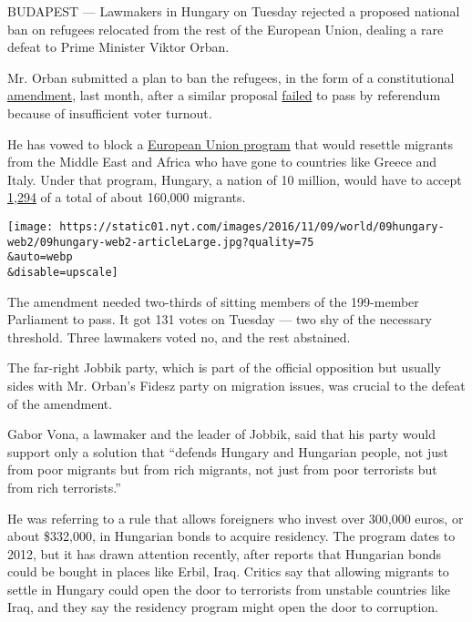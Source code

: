 BUDAPEST --- Lawmakers in Hungary on Tuesday rejected a proposed
national ban on refugees relocated from the rest of the European Union,
dealing a rare defeat to Prime Minister Viktor Orban.

Mr. Orban submitted a plan to ban the refugees, in the form of a
constitutional
\href{http://www.kormany.hu/en/the-prime-minister/news/the-prime-minister-has-submitted-to-parliament-a-bill-for-a-constitutional-amendment}{amendment},
last month, after a similar proposal
\href{http://www.nytimes.com/2016/10/03/world/europe/hungary-to-vote-on-accepting-more-migrants-as-europe-watches.html}{failed}
to pass by referendum because of insufficient voter turnout.

He has vowed to block a
\href{http://europa.eu/rapid/press-release_IP-15-6134_en.htm}{European
Union program} that would resettle migrants from the Middle East and
Africa who have gone to countries like Greece and Italy. Under that
program, Hungary, a nation of 10 million, would have to accept
\href{http://ec.europa.eu/dgs/home-affairs/what-we-do/policies/european-agenda-migration/press-material/docs/state_of_play_-_relocation_en.pdf}{1,294}
of a total of about 160,000 migrants.

\texttt{[image: https://static01.nyt.com/images/2016/11/09/world/09hungary-web2/09hungary-web2-articleLarge.jpg?quality=75\\\&auto=webp\\\&disable=upscale]}

The amendment needed two-thirds of sitting members of the 199-member
Parliament to pass. It got 131 votes on Tuesday --- two shy of the
necessary threshold. Three lawmakers voted no, and the rest abstained.

The far-right Jobbik party, which is part of the official opposition but
usually sides with Mr. Orban's Fidesz party on migration issues, was
crucial to the defeat of the amendment.

Gabor Vona, a lawmaker and the leader of Jobbik, said that his party
would support only a solution that ``defends Hungary and Hungarian
people, not just from poor migrants but from rich migrants, not just
from poor terrorists but from rich terrorists.''

He was referring to a rule that allows foreigners who invest over
300,000 euros, or about \$332,000, in Hungarian bonds to acquire
residency. The program dates to 2012, but it has drawn attention
recently, after reports that Hungarian bonds could be bought in places
like Erbil, Iraq. Critics say that allowing migrants to settle in
Hungary could open the door to terrorists from unstable countries like
Iraq, and they say the residency program might open the door to
corruption.


